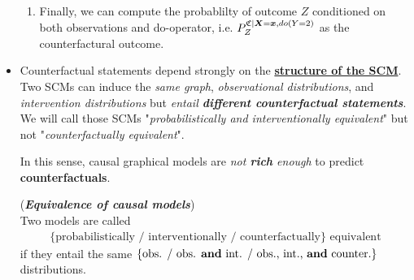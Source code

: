 \documentclass[11pt]{article}
\begin{document}
\begin{itemize}
\begin{enumerate}
\item  Finally, we can compute the probablilty of outcome $Z$ conditioned on both observations and do-operator, i.e. $P_{Z}^{\mathfrak{C}|\boldsymbol{X}=\boldsymbol{x}, do(Y=2)}$ as the counterfactural outcome.
\end{enumerate}

\item Counterfactual statements depend strongly on the \underline{\textbf{structure of the SCM}}. Two SCMs can induce the \emph{same graph}, \emph{observational distributions}, and \emph{intervention distributions} but \emph{entail \textbf{different counterfactual statements}}.  We will call those SCMs "\emph{probabilistically and interventionally equivalent}" but not "\emph{counterfactually equivalent}". 

In this sense, causal graphical models are \emph{not \textbf{rich} enough} to predict \textbf{counterfactuals}.

\begin{definition}(\textbf{\emph{Equivalence of causal models}})  \citep{peters2017elements}\\
 Two models are called
 \begin{align*}
 \{\text{probabilistically / interventionally / counterfactually}\}\text{ equivalent}
 \end{align*}
if they entail the same $\{\text{obs. / obs. \textbf{and} int. / obs., int., \textbf{and} counter.}\}$ distributions.
\end{definition}

\end{itemize}
\end{document}
